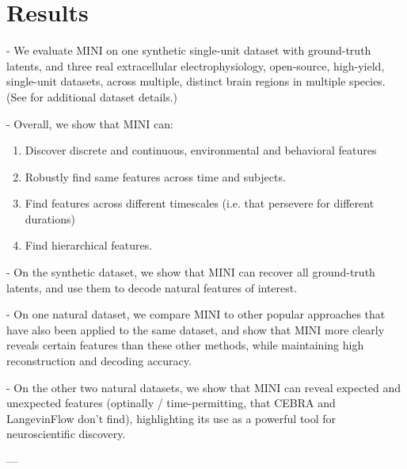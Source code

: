 \section{Results}
\label{section:results}

- We evaluate MINI on one synthetic single-unit dataset with ground-truth latents, and three real extracellular electrophysiology, open-source, high-yield, single-unit datasets, across multiple, distinct brain regions in multiple species. (See  for additional dataset details.)

- Overall, we show that MINI can:
\begin{enumerate}
    \item Discover discrete and continuous, environmental and behavioral features
    \item Robustly find same features across time and subjects.
    \item Find features across different timescales (i.e. that persevere for different durations)
    \item Find hierarchical features.
\end{enumerate}    

- On the synthetic dataset, we show that MINI can recover all ground-truth latents, and use them to decode natural features of interest.

- On one natural dataset, we compare MINI to other popular approaches that have also been applied to the same dataset, and show that MINI more clearly reveals certain features than these other methods, while maintaining high reconstruction and decoding accuracy.

- On the other two natural datasets, we show that MINI can reveal expected and unexpected features (optinally / time-permitting, that CEBRA and LangevinFlow don't find), highlighting its use as a powerful tool for neuroscientific discovery.

---







